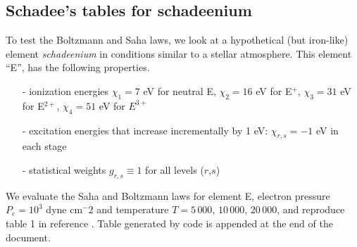 \documentclass{article}
\begin{document}
\subsection{Schadee's tables for schadeenium}
To test the Boltzmann and Saha laws, we look at a hypothetical (but iron-like) element \textit{schadeenium} in conditions similar to a stellar atmosphere. This element ``E'', has the following properties.
\begin{itemize}
  \item[-]ionization energies $\chi_1 = 7$ eV for neutral E, $\chi_2 = 16$ eV for E$^+$, $\chi_3=31$ eV for E$^{2+}$, $\chi_4 = 51$ eV for $E^{3+}$
  \item[-]excitation energies that increase incrementally by 1 eV: $\chi_{r,s} = -1$ eV in each stage
    \item[-]statistical weights $g_{r,s}\equiv 1$ for all levels ($r$,$s$)
\end{itemize}
We evaluate the Saha and Boltzmann laws for element E, electron pressure $P_e = 10^3$ dyne cm$^-2$ and temperature $T = 5\,000$, $10\,000$, $20\,000$, and reproduce table 1 in reference \cite{cite:ssa}. Table generated by code is appended at the end of the document.
\end{document}
